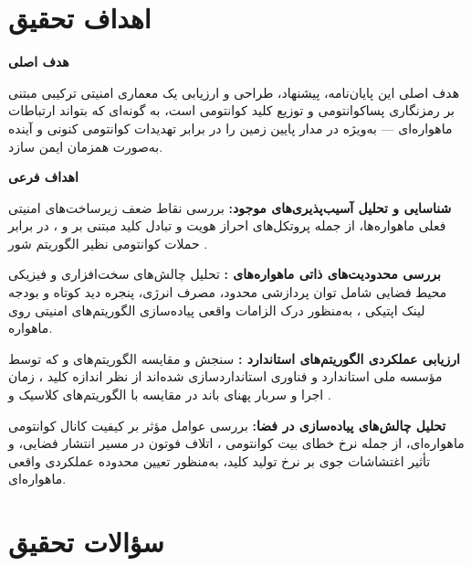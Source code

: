 \documentclass[a4paper,14pt]{extreport}
\begin{document}
\section{اهداف تحقیق}

\textbf{هدف اصلی}

هدف اصلی این پایان‌نامه، پیشنهاد، طراحی و ارزیابی یک معماری امنیتی ترکیبی  مبتنی بر رمزنگاری پساکوانتومی  و توزیع کلید کوانتومی  است، به گونه‌ای که بتواند ارتباطات ماهواره‌ای --- به‌ویژه در مدار پایین زمین   را در برابر تهدیدات کوانتومی کنونی و آینده به‌صورت همزمان ایمن سازد.

\medskip
\textbf{اهداف فرعی}

\textbf{شناسایی و تحلیل آسیب‌پذیری‌های موجود:} بررسی نقاط ضعف زیرساخت‌های امنیتی فعلی ماهواره‌ها، از جمله پروتکل‌های احراز هویت و تبادل کلید مبتنی بر  و ، در برابر حملات کوانتومی نظیر الگوریتم شور .

\textbf{بررسی محدودیت‌های ذاتی ماهواره‌های :} تحلیل چالش‌های سخت‌افزاری و فیزیکی محیط فضایی شامل توان پردازشی محدود، مصرف انرژی، پنجره دید کوتاه و بودجه لینک اپتیکی ، به‌منظور درک الزامات واقعی پیاده‌سازی الگوریتم‌های امنیتی روی ماهواره.

\textbf{ارزیابی عملکردی الگوریتم‌های استاندارد :} سنجش و مقایسه الگوریتم‌های  و  که توسط مؤسسه ملی استاندارد و فناوری  استانداردسازی شده‌اند  از نظر اندازه کلید ، زمان اجرا  و سربار پهنای باند  در مقایسه با الگوریتم‌های کلاسیک  و .

\textbf{تحلیل چالش‌های پیاده‌سازی  در فضا:} بررسی عوامل مؤثر بر کیفیت کانال کوانتومی ماهواره‌ای، از جمله نرخ خطای بیت کوانتومی ، اتلاف فوتون در مسیر انتشار فضایی، و تأثیر اغتشاشات جوی بر نرخ تولید کلید، به‌منظور تعیین محدوده عملکردی واقعی  ماهواره‌ای.

\section{سؤالات تحقیق}
\end{document}
